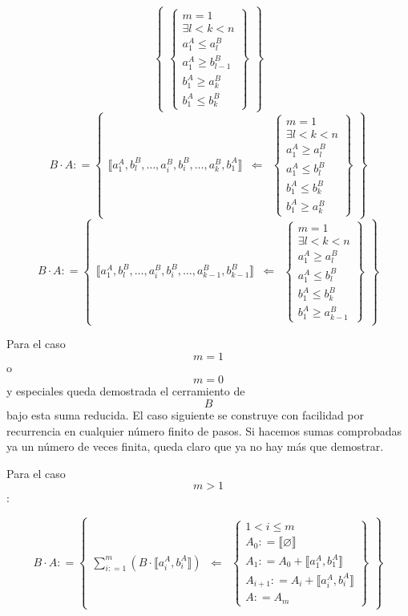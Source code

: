 \begin{enumerate}
\[\begin{Bmatrix}
\begin{Bmatrix}
  {m = 1} \\
  {\exists{{l < k} < n}} \\
  {a_{1}^{A} \leq a_{l}^{B}} \\
  {a_{1}^{A} \geq b_{l - 1}^{B}} \\
  {b_{1}^{A} \geq a_{k}^{B}} \\
  {b_{1}^{A} \leq b_{k}^{B}}
  \end{Bmatrix}
  \end{Bmatrix}\]\[{{B \cdot A}{: =}}\begin{Bmatrix}
  {⟦{{a_{1}^{A},b_{l}^{B}},\ldots,{a_{i}^{B},b_{i}^{B}},\ldots,{a_{k}^{B},b_{1}^{A}}}⟧} & \Leftarrow & \begin{Bmatrix}
  {m = 1} \\
  {\exists{{l < k} < n}} \\
  {a_{1}^{A} \geq a_{l}^{B}} \\
  {a_{1}^{A} \leq b_{l}^{B}} \\
  {b_{1}^{A} \leq b_{k}^{B}} \\
  {b_{1}^{A} \geq a_{k}^{B}}
  \end{Bmatrix}
  \end{Bmatrix}\]\[{{B \cdot A}{: =}}\begin{Bmatrix}
  {⟦{{a_{1}^{A},b_{l}^{B}},\ldots,{a_{i}^{B},b_{i}^{B}},\ldots,{a_{k - 1}^{B},b_{k - 1}^{B}}}⟧} & \Leftarrow & \begin{Bmatrix}
  {m = 1} \\
  {\exists{{l < k} < n}} \\
  {a_{1}^{A} \geq a_{l}^{B}} \\
  {a_{1}^{A} \leq b_{l}^{B}} \\
  {b_{1}^{A} \leq b_{k}^{B}} \\
  {b_{1}^{A} \geq a_{k - 1}^{B}}
  \end{Bmatrix}
  \end{Bmatrix}\]

  Para el caso \[m = 1\] o \[m = 0\] y especiales queda demostrada el
  cerramiento de \[B\]bajo esta suma reducida. El caso siguiente se
  construye con facilidad por recurrencia en cualquier número finito de
  pasos. Si hacemos sumas comprobadas ya un número de veces finita,
  queda claro que ya no hay más que demostrar.

  Para el caso \[m > 1\]:

  \[{{B \cdot A}{: =}}\begin{Bmatrix}
  {\sum\limits_{i{: = 1}}^{m}\left( {B \cdot {⟦{a_{i}^{A},b_{i}^{A}}⟧}} \right)} & \Leftarrow & \begin{Bmatrix}
  {{1 < i} \leq m} \\
  {A_{0}{: = {⟦\varnothing ⟧}}} \\
  {A_{1}{: = {A_{0} + {⟦{a_{1}^{A},b_{1}^{A}}⟧}}}} \\
  {A_{i + 1}{: = {A_{i} + {⟦{a_{i}^{A},b_{i}^{A}}⟧}}}} \\
  {A{: = A_{m}}}
  \end{Bmatrix}
  \end{Bmatrix}\]


\end{enumerate}
